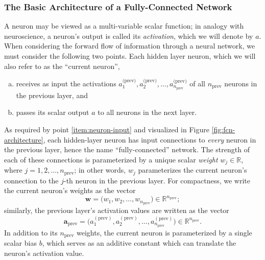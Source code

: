 \documentclass[11pt, a4paper]{article}
\renewcommand{\vec}[1]{\bm{#1}}
\newcommand{\w}{\vec{w}}
\renewcommand{\a}{\vec{a}}
\begin{document}
\subsubsection{The Basic Architecture of a Fully-Connected Network}
A neuron may be viewed as a multi-variable scalar function; in analogy with neuroscience, a neuron's output is called its \textit{activation}, which we will denote by $ a $.
When considering the forward flow of information through a neural network, we must consider the following two points.
Each hidden layer neuron, which we will also refer to as the ``current neuron'',
\begin{enumerate}[(a)]

    \item \label{item:neuron-input} receives as input the activations $ a^{\text{(prev)}}_{1}, a^{\text{(prev)}}_{2}, \ldots, a^{\text{(prev)}}_{n_{\text{prev}}}  $ of all $ n_{\text{prev}} $ neurons in the previous layer, and

    \item passes its scalar output $ a $ to all neurons in the next layer.

\end{enumerate}
As required by point \ref{item:neuron-input} and visualized in Figure \ref{fig:fcn-architecture}, each hidden-layer neuron has input connections to \textit{every} neuron in the previous layer, hence the name ``fully-connected'' network.
The strength of each of these connections is parameterized by a unique scalar \textit{weight} $ w_{j} \in \mathbb{R} $, where $  j = 1, 2, \ldots, n_{\text{prev}} $; in other words, $ w_{j} $ parameterizes the current neuron's connection to the $ j $-th neuron in the previous layer.
For compactness, we write the current neuron's weights as the vector
\begin{equation*}
    \w = \big( w_{1}, w_{2}, \ldots, w_{n_{\text{prev}}} \big) \in \mathbb{R}^{n_{\text{prev}}};
\end{equation*}
similarly, the previous layer's activation values are written as the vector
\begin{equation*}
    \a_{\text{prev}} = \Big( a_{1}^{(\text{prev})}, a_{2}^{(\text{prev})}, \ldots, a_{n_{\text{prev}}}^{(\text{prev})} \Big) \in \mathbb{R}^{n_{\text{prev}}}.
\end{equation*}
In addition to its $ n_{\text{prev}} $ weights, the current neuron is parameterized by a single scalar bias $ b $, which serves as an additive constant which can translate the neuron's activation value.
\end{document}
